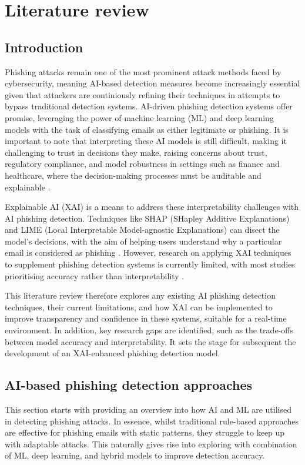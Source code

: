 \section{Literature review}

\subsection*{Introduction}
Phishing attacks remain one of the most prominent attack methods faced by cybersecurity, meaning AI-based detection measures become increasingly essential given that attackers are continiously refining their techniques in attempts to bypass traditional detection systems. AI-driven phishing detection systems offer promise, leveraging the power of machine learning (ML) and deep learning models with the task of classifying emails as either legitimate or phishing. It is important to note that interpreting these AI models is still difficult, making it challenging to trust in decisions they make, raising concerns about trust, regulatory compliance, and model robustness in settings such as finance and healthcare, where the decision-making processes must be auditable and explainable \citep{jain2022survey}.\newline

\noindent Explainable AI (XAI) is a means to address these interpretability challenges with AI phishing detection. Techniques like SHAP (SHapley Additive Explanations) and LIME (Local Interpretable Model-agnostic Explanations) can disect the model's decisions, with the aim of helping users understand why a particular email is considered as phishing \citep{lundberg2017unified}. However, research on applying XAI techniques to supplement phishing detection systems is currently limited, with most studies prioritising accuracy rather than interpretability \citep{ribeiro2016model}.\newline

\noindent This literature review therefore explores any existing AI phishing detection techniques, their current limitations, and how XAI can be implemented to improve transparency and confidence in these systems, suitable for a real-time environment. In addition, key research gaps are identified, such as the trade-offs between model accuracy and interpretability. It sets the stage for subsequent the development of an XAI-enhanced phishing detection model.

\newpage

\subsection*{AI-based phishing detection approaches}
This section starts with providing an overview into how AI and ML are utilised in detecting phishing attacks. In essence, whilst traditional rule-based approaches are effective for phishing emails with static patterns, they struggle to keep up with adaptable attacks. This naturally gives rise into exploring with combination of ML, deep learning, and hybrid models to improve detection accuracy.

